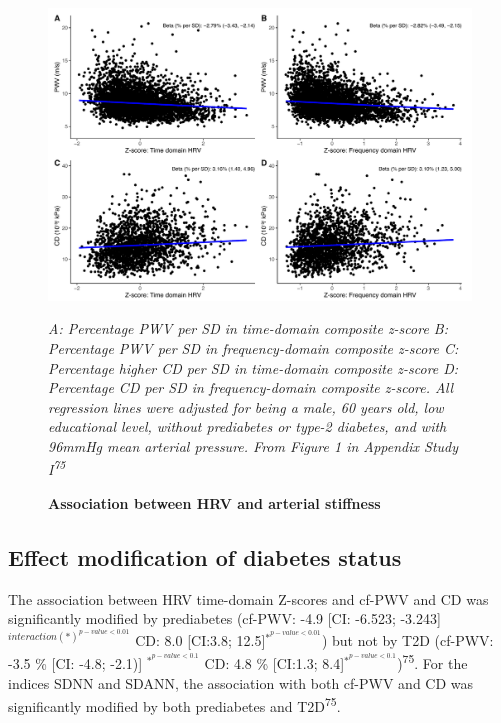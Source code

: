 \documentclass[
  letterpaper,
  headsepline=true,
  open=any]{scrbook}
\begin{document}
\begin{figure}

{\centering 

\includegraphics{images/figure3_linear_plot.pdf}

\emph{A: Percentage PWV per SD in time-domain composite z-score B:
Percentage PWV per SD in frequency-domain composite z-score C:
Percentage higher CD per SD in time-domain composite z-score D:
Percentage CD per SD in frequency-domain composite z-score. All
regression lines were adjusted for being a male, 60 years old, low
educational level, without prediabetes or type-2 diabetes, and with
96mmHg mean arterial pressure. From Figure 1 in Appendix Study
I\textsuperscript{75}}

}

\caption{\label{fig-MS-HRV}\textbf{Association between HRV and arterial
stiffness}}

\end{figure}

\hypertarget{effect-modification-of-diabetes-status}{%
\subsection{Effect modification of diabetes
status}\label{effect-modification-of-diabetes-status}}

The association between HRV time-domain Z-scores and cf-PWV and CD was
significantly modified by prediabetes (cf-PWV: -4.9 {[}CI: -6.523;
-3.243{]} \(^{interaction(*) ^{p-value< 0.01}}\) CD: 8.0 {[}CI:3.8;
12.5{]}\(^{*^{p-value< 0.01}}\)) but not by T2D (cf-PWV: -3.5 \% {[}CI:
-4.8; -2.1){]} \(^{*^{p-value< 0.1}}\) CD: 4.8 \% {[}CI:1.3;
8.4{]}\(^{*^{p-value< 0.1}}\))\textsuperscript{75}. For the indices SDNN
and SDANN, the association with both cf-PWV and CD was significantly
modified by both prediabetes and T2D\textsuperscript{75}.
\end{document}
